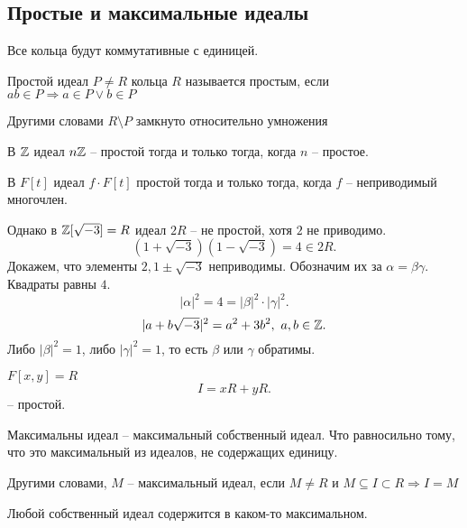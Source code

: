 \documentclass[12pt]{report}
\begin{document}
\subsection{Простые и максимальные идеалы}
Все кольца будут коммутативные с единицей.
\begin{defn}
    Простой идеал $ P \ne R$ кольца $ R$ называется простым, если $ ab \in  P \Rightarrow a \in  P \vee b \in  P$ 
\end{defn}
\begin{note}
    Другими словами $ R \setminus P$ замкнуто относительно умножения
\end{note}
\begin{ex}
    В $ \mathbb{Z}$ идеал $ n\mathbb{Z}$ -- простой тогда и только тогда, когда  $ n $ -- простое.
\end{ex}
\begin{ex}
    В $ F[t]$ идеал $ f \cdot F[t]$ простой тогда и только тогда, когда $ f$ -- неприводимый многочлен.
\end{ex}
\begin{ex}
    Однако в $ \mathbb{Z}[\sqrt{-3}]=R$  идеал $ 2R$ -- не простой, хотя $ 2$ не приводимо.
	\[
	    (1 + \sqrt{-3})(1-\sqrt{-3}) = 4 \in  2R
	.\] 
	Докажем, что элементы $ 2, 1 \pm \sqrt{-3}$ неприводимы.   Обозначим их за $ \alpha  = \beta \gamma$. Квадраты равны  $ 4$. 
	\[
	| \alpha |^2 = 4 = | \beta |^2 \cdot | \gamma|^2
	.\] 
	\[
	    |a + b\sqrt{-3}| ^2 = a^2+ 3 b^2, ~a, b \in  \mathbb{Z} 
	.\] 		
	Либо $ | \beta |^2 = 1$, либо $ | \gamma|^2 = 1$, то есть $ \beta $ или $ \gamma$ обратимы.
\end{ex}
\begin{ex}
    $ F[x, y] = R$
     \[
    I = xR + yR
    .\] -- простой.
\end{ex}
\begin{defn}
    Максимальны идеал -- максимальный собственный идеал. 
    Что равносильно тому, что это максимальный из идеалов, не содержащих единицу.
\end{defn}
\begin{note}
     Другими словами, $ M$ -- максимальный идеал, если $ M \ne R$ и $ M \subseteq I \subset R \Rightarrow I = M$
\end{note}
\begin{thm}
    Любой собственный идеал содержится в каком-то максимальном.
\end{thm}
\end{document}
